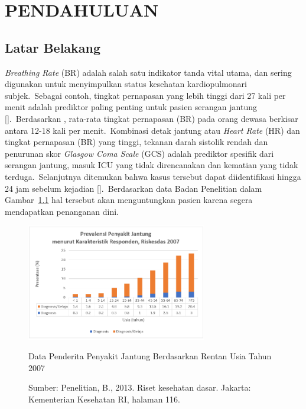 
\chapter{PENDAHULUAN}  %

	\ifpdf
	\graphicspath{{Chapter1/Figs/Raster/}{Chapter1/Figs/PDF/}{Chapter1/Figs/}}
	\else
	\graphicspath{{Chapter1/Figs/Vector/}{Chapter1/Figs/}}
	\fi


\section{Latar Belakang}
 \textit{Breathing Rate} (BR) adalah salah satu indikator tanda vital utama, dan sering digunakan untuk menyimpulkan status kesehatan kardiopulmonari subjek.~Sebagai contoh, tingkat pernapasan yang lebih tinggi dari 27 kali per menit adalah prediktor paling penting untuk pasien serangan jantung [\citet{fieselmann1993}].~Berdasarkan \citet{Ganong}, rata-rata tingkat pernapasan (BR) pada orang dewasa berkisar antara 12-18 kali per menit.~Kombinasi detak jantung atau \textit{Heart Rate} (HR) dan tingkat pernapasan (BR) yang tinggi, tekanan darah sistolik rendah dan penurunan skor \textit{Glasgow Coma Scale} (GCS) adalah prediktor spesifik dari serangan jantung, masuk ICU yang tidak direncanakan dan kematian yang tidak terduga.~Selanjutnya ditemukan bahwa kasus tersebut dapat diidentifikasi hingga 24 jam sebelum kejadian [\citet{cretikos2007}].~Berdasarkan data Badan Penelitian \citep{RI2013} dalam Gambar~\ref{fig:data_penyakit_jantung} hal tersebut akan menguntungkan pasien karena segera mendapatkan penanganan dini.
\begin{figure}[ht]
	\vspace{0.5em}
	\centering
	\includegraphics[width=0.7\textwidth]{Chapter1/Figs/chart_penderita_jantung}
	\caption{Data Penderita Penyakit Jantung Berdasarkan Rentan Usia Tahun 2007}
	\caption*{Sumber: Penelitian, B., 2013. Riset kesehatan dasar. Jakarta: Kementerian Kesehatan RI, halaman 116.}
	\label{fig:data_penyakit_jantung}   
\end{figure}

